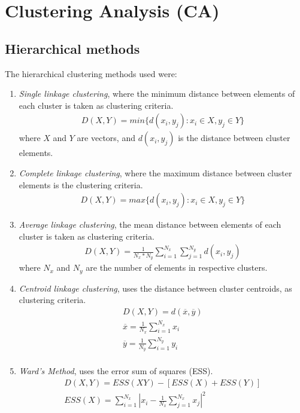 \chapter{Clustering Analysis (CA)}
\label{appendix_a}

\section{Hierarchical methods}
The hierarchical clustering methods used were:

\begin{enumerate}
\item{
\textit{Single linkage clustering}, where the minimum distance between
elements of each cluster is taken as clustering criteria.
\begin{gather}
D(X, Y)=min\{d(x_i, y_j): x_i \in X, y_j \in Y \}
\end{gather}
where $X$ and $Y$ are vectors, and $d(x_i, y_j)$ is the distance
between cluster elements.
}

\item{
\textit{Complete linkage clustering}, where the maximum distance between
cluster elements is the clustering criteria.
\begin{gather}
D(X, Y)=max\{d(x_i, y_j): x_i \in X, y_j \in Y \}
\end{gather}
}

\item{
\textit{Average linkage clustering}, the mean distance between elements of
each cluster is taken as clustering criteria.
\begin{gather}
D(X, Y)=\frac{1}{N_x * N_y} \sum_{i=1}^{N_x} \sum_{j=1}^{N_y} d(x_i, y_j)
\end{gather}
where $N_x$ and $N_y$ are the number of elements in respective clusters.
}

\item{
\textit{Centroid linkage clustering}, uses the distance between cluster
centroids, as clustering criteria.
\begin{gather}
D(X, Y)=d(\overline{x}, \overline{y})\\
\overline{x} = \frac{1}{N_x} \sum_{i=1}^{N_x} x_i\\
\overline{y} = \frac{1}{N_y} \sum_{i=1}^{N_y} y_i\\
\end{gather}
}

\item{
\textit{Ward's Method}, uses the error sum of squares (ESS).
\begin{gather}
D(X,Y)=ESS(XY) -[ESS(X) + ESS(Y)]\\
ESS(X)= \sum_{i=1}^{N_x} \left| x_i -\frac{1}{N_x}\sum_{j=1}^{N_x} x_j\right|^2
\end{gather}
}
\end{enumerate}




